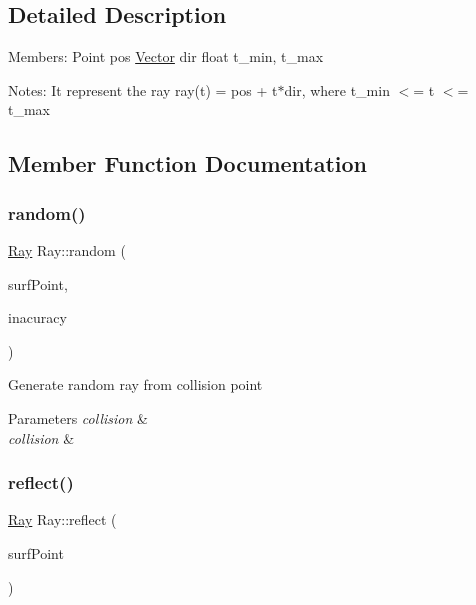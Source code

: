 \subsection{Detailed Description}
Members\+: Point pos \mbox{\hyperlink{struct_vector}{Vector}} dir float t\+\_\+min, t\+\_\+max

Notes\+: It represent the ray ray(t) = pos + t$\ast$dir, where t\+\_\+min $<$= t $<$= t\+\_\+max 

\subsection{Member Function Documentation}
\mbox{\label{class_ray_a6198c0a3ef332817bec5e8421a04cb31}} 
\subsubsection{\texorpdfstring{random()}{random()}}
{\footnotesize\ttfamily \mbox{\hyperlink{class_ray}{Ray}} Ray\+::random (\begin{DoxyParamCaption}\item[{const \mbox{\hyperlink{class_surface_point}{Surface\+Point}} \&}]{surf\+Point,  }\item[{float}]{inacuracy }\end{DoxyParamCaption})\hspace{0.3cm}{\ttfamily [inline]}}

Generate random ray from collision point 
\begin{DoxyParams}{Parameters}
{\em collision} & \\
\hline
{\em collision} & \\
\hline
\end{DoxyParams}
\mbox{\label{class_ray_ad3c0dfd18653aeb61735b3f720498dc8}} 
\subsubsection{\texorpdfstring{reflect()}{reflect()}\hspace{0.1cm}{\footnotesize\ttfamily [1/2]}}
{\footnotesize\ttfamily \mbox{\hyperlink{class_ray}{Ray}} Ray\+::reflect (\begin{DoxyParamCaption}\item[{const \mbox{\hyperlink{class_surface_point}{Surface\+Point}} \&}]{surf\+Point }\end{DoxyParamCaption})\hspace{0.3cm}{\ttfamily [inline]}}

